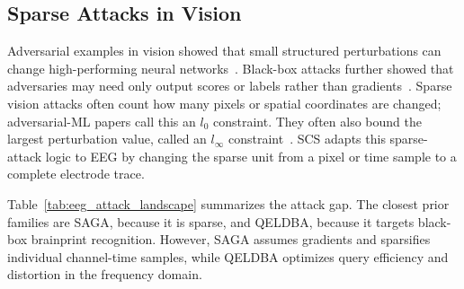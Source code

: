 \documentclass[journal]{IEEEtran}
\begin{document}
\subsection{Sparse Attacks in Vision}

Adversarial examples in vision showed that small structured perturbations can change high-performing neural networks~\cite{szegedy2014intriguing,goodfellow2015explaining}. Black-box attacks further showed that adversaries may need only output scores or labels rather than gradients~\cite{papernot2017practical,chen2017zoo}. Sparse vision attacks often count how many pixels or spatial coordinates are changed; adversarial-ML papers call this an $l_0$ constraint. They often also bound the largest perturbation value, called an $l_\infty$ constraint~\cite{croce2019sparse}. SCS adapts this sparse-attack logic to EEG by changing the sparse unit from a pixel or time sample to a complete electrode trace.

Table~\ref{tab:eeg_attack_landscape} summarizes the attack gap. The closest prior families are SAGA, because it is sparse, and QELDBA, because it targets black-box brainprint recognition. However, SAGA assumes gradients and sparsifies individual channel-time samples, while QELDBA optimizes query efficiency and distortion in the frequency domain.
\end{document}
